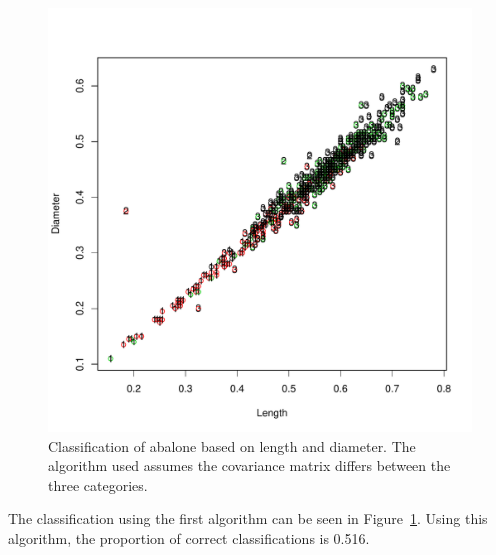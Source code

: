\documentclass{article}\usepackage[]{graphicx}\usepackage[]{color}
\makeatletter
\def\maxwidth{ %
  \ifdim\Gin@nat@width>\linewidth
    \linewidth
  \else
    \Gin@nat@width
  \fi
}
\newenvironment{knitrout}{}{} %
\makeatother
\begin{document}
\begin{knitrout}
\color{fgcolor}\begin{figure}
\includegraphics[width=\maxwidth]{figure/em_plot1-1} \caption[Classification of abalone based on length and diameter]{Classification of abalone based on length and diameter.  The algorithm used assumes the covariance matrix differs between the three categories.}\label{fig:em_plot1}
\end{figure}


\end{knitrout}

The classification using the first algorithm can be seen in Figure~\ref{fig:em_plot1}. Using this algorithm, the proportion of correct classifications is 0.516.
\end{document}
